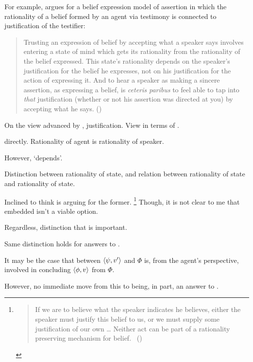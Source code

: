 \begin{note}
  For example, \citeauthor{Owens:2006tw} argues for a belief expression model of assertion in which the rationality of a belief formed by an agent via testimony is connected to justification of the testifier:

  \begin{quote}
    Trusting an expression of belief by accepting what a speaker says involves entering a state of mind which gets its rationality from the rationality of the belief expressed.
    This state's rationality depends on the speaker's justification for the belief he expresses, not on his justification for the action of expressing it.
    And to hear a speaker as making a sincere assertion, as expressing a belief, is \emph{ceteris paribus} to feel able to tap into \emph{that} justification (whether or not his assertion was directed at you) by accepting what he says.%
    \mbox{}\hfill\mbox{(\citeyear[123]{Owens:2006tw})}
  \end{quote}

  On the view advanced by \citeauthor{Owens:2006tw}, justification.
  View in terms of \support{}.

  \support{} directly.
  Rationality of agent is rationality of speaker.

  However, `depends'.

  Distinction between rationality of state, and relation between rationality of state and rationality of state.

  Inclined to think \citeauthor{Owens:2006tw} is arguing for the former.%
  \footnote{
    \begin{quote}
      If we are to believe what the speaker indicates he believes, either the speaker must justify this belief to us, or we must supply some justification of our own
      \dots
      Neither act can be part of a rationality preserving mechanism for belief.%
      \mbox{ }\hfill\mbox{(\citeyear[123--124]{Owens:2006tw})}
    \end{quote}
  }
  Though, it is not clear to me that embedded isn't a viable option.

  Regardless, distinction that is important.
\end{note}

\begin{note}
  Same distinction holds for answers to \qWhyV{}.

  It may be the case that \support{} between \(\langle \psi, v' \rangle\) and \(\Phi\) is, from the agent's perspective, involved in concluding \(\langle \phi, v \rangle\) from \(\Phi\).

  However, no immediate move from this to \support{} being, in part, an answer to \qWhyV{}.
\end{note}


